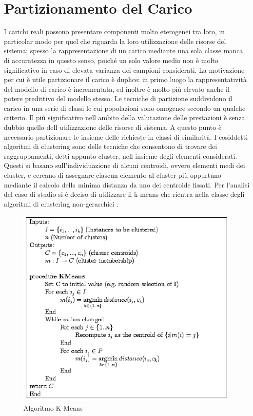 \section{Partizionamento del Carico}
I carichi reali possono presentare componenti molto eterogenei tra loro, in particolar modo per quel che riguarda la loro utilizzazione delle risorse del sistema; spesso la rappresentazione di un carico mediante una sola classe manca di accuratezza in questo senso, poiché un solo valore medio non è 
molto significativo in caso di elevata varianza dei campioni considerati. La motivazione per cui è utile partizionare il carico è duplice: in primo luogo la rappresentatività del modello di carico è incrementata, ed inoltre è molto più elevato anche il potere predittivo del modello stesso. Le tecniche di partizione suddividono il carico in una serie di classi le cui popolazioni sono omogenee secondo un qualche criterio. Il più significativo nell ambito della 
valutazione delle prestazioni è senza dubbio quello dell utilizzazione delle risorse di sistema. A questo punto è necessario partizionare le insieme delle richieste in classi di similarità. I cosiddetti algoritmi di clustering sono delle tecniche che consentono di trovare dei raggruppamenti, detti appunto cluster, nell insieme degli elementi considerati. Questi si basano sull'individuazione di alcuni centroidi, ovvero elementi medi dei cluster, e cercano di assegnare ciascun elemento al cluster più oppurtuno mediante il calcolo della minima distanza da uno dei centroide fissati. 
Per l'analisi del caso di studio si è deciso di utilizzare il k-means che rientra nella classe degli algoritmi di clustering non-gerarchici . 
\begin{figure}[H]
\begin{center}
\includegraphics[scale=0.71]{etc/kmeans.png}
\caption{Algoritmo K-Means}
\label{schema3}
\end{center}
\end{figure}
